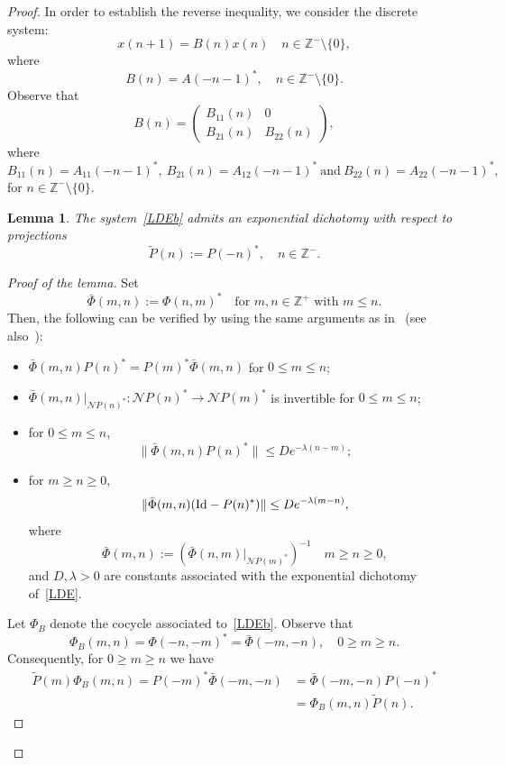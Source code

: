\documentclass[11pt,reqno,a4paper]{amsart}
\theoremstyle{plain}
\numberwithin{equation}{section}
\newtheorem{lemma}{Lemma}
\theoremstyle{remark}
\def\Id{\text{\rm Id}}
\def\Z{\mathbb{Z}}
\begin{document}
\begin{proof}
In order to establish the reverse inequality, we consider the discrete system:
\begin{equation}\label{LDEb}
x(n+1)=B(n)x(n) \quad n\in \Z^-\setminus \{0\},
\end{equation}
where \[B(n)=A(-n-1)^*, \quad  n\in \Z^-\setminus \{0\}.\] Observe that 
\[
B(n)=\begin{pmatrix}
B_{11}(n) & 0 \\
B_{21}(n) & B_{22}(n)
\end{pmatrix},
\]
where 
\[
B_{11}(n)=A_{11}(-n-1)^*, \  B_{21}(n)=A_{12}(-n-1)^* \ \text{and} \ B_{22}(n)=A_{22}(-n-1)^*,
\]
for $n\in \Z^-\setminus \{0\}$. 
\begin{lemma}\label{lemadj}
The system~\eqref{LDEb} admits an exponential dichotomy with respect to projections
\[
\tilde P(n):=P(-n)^*, \quad n\in \Z^-.
\]
\end{lemma}
\begin{proof}[Proof of the lemma]
Set
\[
\bar \Phi (m, n):=\Phi(n, m)^* \quad \text{for $m, n\in \Z^+$ with $m\le n$.}
\]
Then, the following can be  verified by using the same arguments as in~\cite[Proposition 2.2.]{RZ} (see also~\cite[p.229]{Lin}):
\begin{itemize}
\item $\bar \Phi(m, n)P(n)^*=P(m)^*\bar \Phi(m, n)$ for $0\le m\le n$;
\item $\bar{\Phi}(m, n)\rvert_{\mathcal N P(n)^*}\colon \mathcal N P(n)^* \to \mathcal N P(m)^*$ is invertible for $0\le m\le n$;
\item for $0\le m\le n$,
\begin{equation}\label{dica1}
\| \bar \Phi(m, n)P(n)^*\| \le De^{-\lambda (n-m)};
\end{equation}
\item for $m\ge n\ge 0$,
\[
\| \bar \Phi(m, n)(\Id-P(n)^*)\| \le De^{-\lambda (m-n)},
\]
where 
\[
\bar \Phi(m, n):=\left (\bar \Phi(n, m)\rvert_{\mathcal N P(m)^*}\right )^{-1} \quad m\ge n\ge 0,
\]
and $D, \lambda>0$ are constants associated with the exponential dichotomy of~\eqref{LDE}.
\end{itemize}
Let $\Phi_B$ denote the cocycle associated to~\eqref{LDEb}. Observe that
\[
\Phi_B(m, n)=\Phi(-n, -m)^*=\bar \Phi(-m, -n), \quad 0\ge m\ge n.
\]
Consequently, for $0\ge m \ge n$ we have
\[
\begin{split}
\tilde P(m)\Phi_B(m, n)=P(-m)^*\bar \Phi(-m, -n) &=\bar \Phi(-m, -n)P(-n)^* \\
&=\Phi_B(m, n)\tilde P(n).
\end{split}
\]
\end{proof}
\end{proof}
\end{document}
